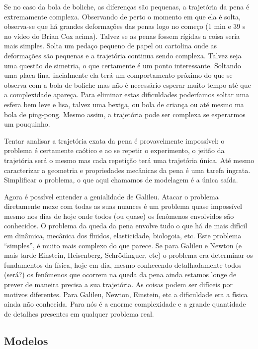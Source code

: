 Se no caso da bola de boliche, as diferenças são pequenas, a trajetória da pena é extremamente complexa. Observando de perto o momento em que ela é solta, observa-se que há grandes deformações das penas logo no começo (1 min e 39 s no vídeo do Brian Cox acima). Talvez se as penas fossem rígidas a coisa seria mais simples. Solta um pedaço pequeno de papel ou cartolina onde as deformações são pequenas e a trajetória continua sendo complexa. Talvez seja uma questão de simetria, o que certamente é um ponto interessante. Soltando uma placa fina, incialmente ela terá um comportamento próximo do que se observa com a bola de boliche mas não é necessário esperar muito tempo até que a complexidade apareça. Para eliminar estas dificuldades poderíamos soltar uma esfera bem leve e lisa, talvez uma bexiga, ou bola de criança ou até mesmo ma bola de ping-pong. Mesmo assim, a trajetória pode ser complexa se esperarmos um pouquinho.


Tentar analisar a trajetória exata da pena é provavelmente impossível: o problema é certamente caótico e ao se repetir o experimento, o jeitão da trajetória será o mesmo mas cada repetição terá uma trajetória única. Até mesmo caracterizar a geometria e propriedades mecânicas da pena é uma tarefa ingrata. Simplificar o problema, o que aqui chamamos de modelagem é a única saída.

Agora é possível entender a genialidade de Galileu. Atacar o problema diretamente mexe com todas as suas nuances  é um problema quase impossível mesmo nos dias de hoje onde todos (ou quase) os fenômenos envolvidos são conhecidos. O problema da queda da pena envolve tudo o que há de mais difícil  em dinâmica, mecânica dos fluidos, elasticidade, biologoia, etc. Este problema ``simples'', é muito mais complexo do que parece. Se para Galileu e Newton (e mais tarde Einstein, Heisenberg, Schrödinguer, etc) o problema era determinar os fundamentos da física, hoje em dia, mesmo conhecendo detalhadamente todos (será?) os fenômenos que ocorrem na queda da pena ainda estamos longe de prever de maneira precisa a sua trajetória. As coisas podem ser difíceis por motivos diferentes. Para Galileu, Newton, Einstein, etc a dificuldade era a física ainda não conhecida. Para nós é a enorme complexidade e a grande quantidade de detalhes presentes em qualquer problema real.

\subsection{Modelos}

